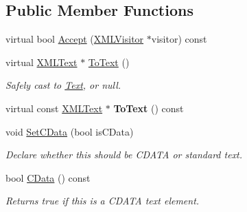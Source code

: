 \subsection*{Public Member Functions}
\begin{DoxyCompactItemize}
\item 
virtual bool \hyperlink{classtinyxml2_1_1XMLText_a537c60d7e18fb59c45ac2737a29ac47a}{Accept} (\hyperlink{classtinyxml2_1_1XMLVisitor}{X\+M\+L\+Visitor} $\ast$visitor) const
\item 
\mbox{\label{classtinyxml2_1_1XMLText_ab1213b4ddebe9b17ec7e7040e9f1caf7}} 
virtual \hyperlink{classtinyxml2_1_1XMLText}{X\+M\+L\+Text} $\ast$ \hyperlink{classtinyxml2_1_1XMLText_ab1213b4ddebe9b17ec7e7040e9f1caf7}{To\+Text} ()
\begin{DoxyCompactList}\small\item\em Safely cast to \hyperlink{classText}{Text}, or null. \end{DoxyCompactList}\item 
\mbox{\label{classtinyxml2_1_1XMLText_a671ce22c7c5ef378f1ce31e6f827b9e2}} 
virtual const \hyperlink{classtinyxml2_1_1XMLText}{X\+M\+L\+Text} $\ast$ {\bfseries To\+Text} () const
\item 
\mbox{\label{classtinyxml2_1_1XMLText_ad080357d76ab7cc59d7651249949329d}} 
void \hyperlink{classtinyxml2_1_1XMLText_ad080357d76ab7cc59d7651249949329d}{Set\+C\+Data} (bool is\+C\+Data)
\begin{DoxyCompactList}\small\item\em Declare whether this should be C\+D\+A\+TA or standard text. \end{DoxyCompactList}\item 
\mbox{\label{classtinyxml2_1_1XMLText_ac1bb5ea4166c320882d9e0ad16fd385b}} 
bool \hyperlink{classtinyxml2_1_1XMLText_ac1bb5ea4166c320882d9e0ad16fd385b}{C\+Data} () const
\begin{DoxyCompactList}\small\item\em Returns true if this is a C\+D\+A\+TA text element. \end{DoxyCompactList}\item 
\mbox{\label{classtinyxml2_1_1XMLText_ac18d9eec9f12b827b0d02b0847bf279e}} 

\end{DoxyCompactItemize}
